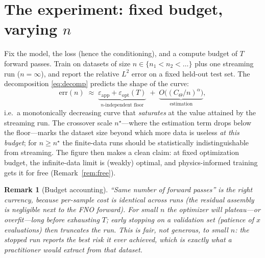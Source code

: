\documentclass[11pt]{article}
\newtheorem{remark}{Remark}
\newcommand{\eps}{\varepsilon}
\begin{document}
\section{The experiment: fixed budget, varying $n$}

Fix the model, the loss (hence the conditioning), and a compute budget of $T$ forward
passes. Train on datasets of size $n\in\{n_1<n_2<\dots\}$ plus one streaming run
($n=\infty$), and report the relative $L^2$ error on a fixed held-out test set. The
decomposition \eqref{eq:decomp} predicts the shape of the curve:
\begin{equation}
  \mathrm{err}(n)
  \;\approx\;
  \underbrace{\eps_{\mathrm{app}} + \eps_{\mathrm{opt}}(T)}_{\text{$n$-independent floor}}
  \;+\;
  \underbrace{O\bigl((C_\Theta/n)^{\alpha}\bigr)}_{\text{estimation}} ,
\end{equation}
i.e.\ a monotonically decreasing curve that \emph{saturates} at the value attained by
the streaming run. The crossover scale $n^\star$---where the estimation term drops below
the floor---marks the dataset size beyond which more data is useless \emph{at this
budget}; for $n\ge n^\star$ the finite-data runs should be statistically
indistinguishable from streaming. The figure then makes a clean claim: at fixed
optimization budget, the infinite-data limit is (weakly) optimal, and physics-informed
training gets it for free (Remark~\ref{rem:free}).

\begin{remark}[Budget accounting]
``Same number of forward passes'' is the right currency, because per-sample cost is
identical across runs (the residual assembly is negligible next to the FNO forward). For
small $n$ the optimizer will plateau---or overfit---long before exhausting $T$; early
stopping on a \emph{validation} set (patience of $x$ evaluations) then truncates the run.
This is fair, not generous, to small $n$: the stopped run reports the best risk it ever
achieved, which is exactly what a practitioner would extract from that dataset.
\end{remark}
\end{document}

